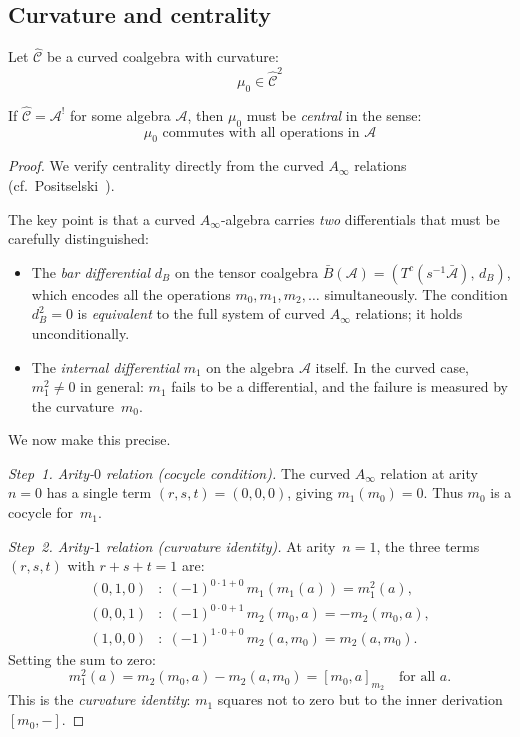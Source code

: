 \subsection{Curvature and centrality}

\begin{theorem}\label{thm:curvature-central-appendix}
Let $\widehat{\mathcal{C}}$ be a curved coalgebra with curvature:
\[\mu_0 \in \widehat{\mathcal{C}}^2\]

If $\widehat{\mathcal{C}} = \mathcal{A}^!$ for some algebra $\mathcal{A}$, then 
$\mu_0$ must be \emph{central} in the sense:
\[\mu_0 \text{ commutes with all operations in } \mathcal{A}\]
\end{theorem}

\begin{proof}
We verify centrality directly from the curved $A_\infty$ relations
(cf.~Positselski~\cite{Positselski11}).

The key point is that a curved $A_\infty$-algebra carries \emph{two}
differentials that must be carefully distinguished:
\begin{itemize}
\item The \emph{bar differential} $d_B$ on the tensor coalgebra
$\bar{B}(\mathcal{A}) = (T^c(s^{-1}\bar{\mathcal{A}}),\, d_B)$,
which encodes all the operations $m_0, m_1, m_2, \ldots$
simultaneously.  The condition $d_B^2 = 0$ is \emph{equivalent} to
the full system of curved $A_\infty$ relations; it holds
unconditionally.
\item The \emph{internal differential} $m_1$ on the algebra
$\mathcal{A}$ itself.  In the curved case, $m_1^2 \neq 0$ in general:
$m_1$ fails to be a differential, and the failure is measured by the
curvature~$m_0$.
\end{itemize}
We now make this precise.

\emph{Step~1. Arity-$0$ relation (cocycle condition).}
The curved $A_\infty$ relation at arity~$n=0$ has a single term
$(r,s,t) = (0,0,0)$, giving $m_1(m_0) = 0$.  Thus $m_0$ is a cocycle
for~$m_1$.

\emph{Step~2. Arity-$1$ relation (curvature identity).}
At arity~$n=1$, the three terms $(r,s,t)$ with $r+s+t=1$ are:
\begin{align*}
(0,1,0) &: \; (-1)^{0 \cdot 1 + 0}\, m_1(m_1(a)) = m_1^2(a), \\
(0,0,1) &: \; (-1)^{0 \cdot 0 + 1}\, m_2(m_0, a) = -m_2(m_0, a), \\
(1,0,0) &: \; (-1)^{1 \cdot 0 + 0}\, m_2(a, m_0) = m_2(a, m_0).
\end{align*}
Setting the sum to zero:
\begin{equation}\label{eq:curvature-identity}
m_1^2(a) = m_2(m_0, a) - m_2(a, m_0) = [m_0, a]_{m_2}
\quad \text{for all } a.
\end{equation}
This is the \emph{curvature identity}: $m_1$ squares not to zero but
to the inner derivation $[m_0, -]$.


\end{proof}

